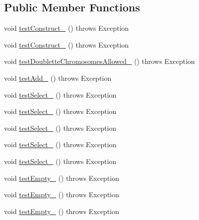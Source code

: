 \subsection*{Public Member Functions}
\begin{DoxyCompactItemize}
\item 
void \hyperlink{classorg_1_1jgap_1_1impl_1_1_best_chromosomes_selector_test_a52b32e57b945d4d94e2058a74c15811f}{test\-Construct\-\_} ()  throws Exception 
\item 
void \hyperlink{classorg_1_1jgap_1_1impl_1_1_best_chromosomes_selector_test_a2b85f1596d640441d40e3f913713d857}{test\-Construct\-\_} ()  throws Exception 
\item 
void \hyperlink{classorg_1_1jgap_1_1impl_1_1_best_chromosomes_selector_test_a27432a83f0ca68f6877b9a97fa1717f8}{test\-Doublette\-Chromosomes\-Allowed\-\_} ()  throws Exception 
\item 
void \hyperlink{classorg_1_1jgap_1_1impl_1_1_best_chromosomes_selector_test_a6800de00c540fdee601e94f96b4852b0}{test\-Add\-\_} ()  throws Exception 
\item 
void \hyperlink{classorg_1_1jgap_1_1impl_1_1_best_chromosomes_selector_test_a58e3715ed962fa9def3987226af463cc}{test\-Select\-\_} ()  throws Exception 
\item 
void \hyperlink{classorg_1_1jgap_1_1impl_1_1_best_chromosomes_selector_test_a307adcabd1ad71cbd83e4317a3e40cbb}{test\-Select\-\_} ()  throws Exception 
\item 
void \hyperlink{classorg_1_1jgap_1_1impl_1_1_best_chromosomes_selector_test_a876723917dda9c683bacc1a4031b48d1}{test\-Select\-\_} ()  throws Exception 
\item 
void \hyperlink{classorg_1_1jgap_1_1impl_1_1_best_chromosomes_selector_test_a6fc17ee759b983eda87ada647a3fa542}{test\-Select\-\_} ()  throws Exception 
\item 
void \hyperlink{classorg_1_1jgap_1_1impl_1_1_best_chromosomes_selector_test_ab3cdb6c266f0e3e3f1a28844b40162c2}{test\-Select\-\_} ()  throws Exception 
\item 
void \hyperlink{classorg_1_1jgap_1_1impl_1_1_best_chromosomes_selector_test_a07d9941f0e699b399cc682539b297f38}{test\-Empty\-\_} ()  throws Exception 
\item 
void \hyperlink{classorg_1_1jgap_1_1impl_1_1_best_chromosomes_selector_test_a83d47f8cd387a47af4c493f5aa79a665}{test\-Empty\-\_} ()  throws Exception 
\item 
void \hyperlink{classorg_1_1jgap_1_1impl_1_1_best_chromosomes_selector_test_a1d20b6036addfc09653c9b62c1baa3b9}{test\-Empty\-\_} ()  throws Exception 

\end{DoxyCompactItemize}
